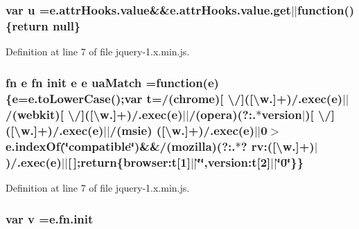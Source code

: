 \subsubsection[{\texorpdfstring{u}{u}}]{\setlength{\rightskip}{0pt plus 5cm}var u ={\bf e.\+attr\+Hooks.\+value}\&\&e.\+attr\+Hooks.\+value.\+get$\vert$$\vert$function()\{return {\bf null}\}}\hypertarget{jquery-1_8x_8min_8js_accb4ce8dd4113ac0f510653e31809106}{}\label{jquery-1_8x_8min_8js_accb4ce8dd4113ac0f510653e31809106}


Definition at line 7 of file jquery-\/1.\+x.\+min.\+js.

\subsubsection[{\texorpdfstring{ua\+Match}{uaMatch}}]{ {\bf fn} {\bf e} {\bf fn} {\bf init} {\bf e} {\bf e} ua\+Match =function({\bf e})\{{\bf e}=e.\+to\+Lower\+Case();var {\bf t}=/(chrome)\mbox{[} \textbackslash{}/\mbox{]}(\mbox{[}\textbackslash{}w.\mbox{]}+)/.exec({\bf e})$\vert$$\vert$/(webkit)\mbox{[} \textbackslash{}/\mbox{]}(\mbox{[}\textbackslash{}w.\mbox{]}+)/.exec({\bf e})$\vert$$\vert$/(opera)(?\+:.$\ast${\bf version}$\vert$)\mbox{[} \textbackslash{}/\mbox{]}(\mbox{[}\textbackslash{}w.\mbox{]}+)/.exec({\bf e})$\vert$$\vert$/(msie) (\mbox{[}\textbackslash{}w.\mbox{]}+)/.exec({\bf e})$\vert$$\vert$0$>$e.\+index\+Of(\char`\"{}compatible\char`\"{})\&\&/(mozilla)(?\+:.$\ast$? rv\+:(\mbox{[}\textbackslash{}w.\mbox{]}+)$\vert$)/.exec({\bf e})$\vert$$\vert$\mbox{[}$\,$\mbox{]};return\{browser\+:t\mbox{[}1\mbox{]}$\vert$$\vert$\char`\"{}\char`\"{},version\+:t\mbox{[}2\mbox{]}$\vert$$\vert$\char`\"{}0\char`\"{}\}\}}\hypertarget{jquery-1_8x_8min_8js_a83209627bbcd8e472c524d831c48cb9b}{}\label{jquery-1_8x_8min_8js_a83209627bbcd8e472c524d831c48cb9b}


Definition at line 7 of file jquery-\/1.\+x.\+min.\+js.

\subsubsection[{\texorpdfstring{v}{v}}]{\setlength{\rightskip}{0pt plus 5cm}var v ={\bf e.\+fn.\+init}}\hypertarget{jquery-1_8x_8min_8js_afc3dd12de12777f6e20b4c93b7e7cb96}{}\label{jquery-1_8x_8min_8js_afc3dd12de12777f6e20b4c93b7e7cb96}


